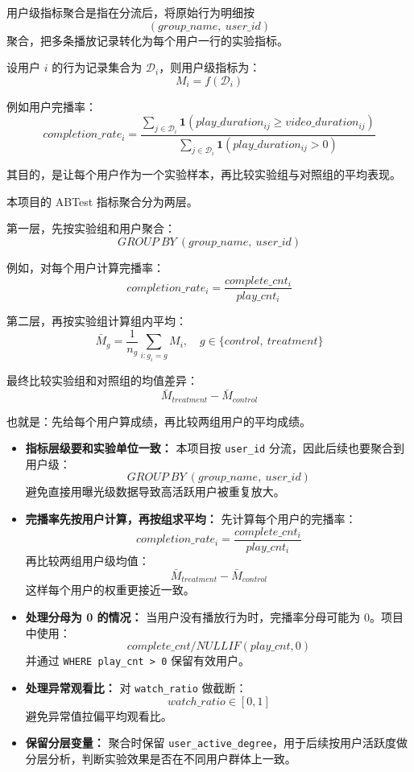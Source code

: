 \begin{definition}[用户级指标聚合]
用户级指标聚合是指在分流后，将原始行为明细按
\[
(group\_name,\ user\_id)
\]
聚合，把多条播放记录转化为每个用户一行的实验指标。

设用户 $i$ 的行为记录集合为 $\mathcal{D}_i$，则用户级指标为：
\[
M_i = f(\mathcal{D}_i)
\]

例如用户完播率：
\[
completion\_rate_i
=
\frac{
\sum_{j \in \mathcal{D}_i}
\mathbf{1}(play\_duration_{ij} \geq video\_duration_{ij})
}{
\sum_{j \in \mathcal{D}_i}
\mathbf{1}(play\_duration_{ij} > 0)
}
\]

其目的，是让每个用户作为一个实验样本，再比较实验组与对照组的平均表现。
\end{definition}
\begin{example}[两层指标聚合]
本项目的 ABTest 指标聚合分为两层。

第一层，先按实验组和用户聚合：
\[
GROUP\ BY\ (group\_name,\ user\_id)
\]

例如，对每个用户计算完播率：
\[
completion\_rate_i
=
\frac{complete\_cnt_i}{play\_cnt_i}
\]

第二层，再按实验组计算组内平均：
\[
\bar{M}_{g}
=
\frac{1}{n_g}
\sum_{i:g_i=g} M_i,
\quad
g \in \{control,\ treatment\}
\]

最终比较实验组和对照组的均值差异：
\[
\bar{M}_{treatment} - \bar{M}_{control}
\]

也就是：先给每个用户算成绩，再比较两组用户的平均成绩。
\end{example}
\begin{itemize}
    \item \textbf{指标层级要和实验单位一致：}
    本项目按 \texttt{user\_id} 分流，因此后续也要聚合到用户级：
    \[
    GROUP\ BY\ (group\_name,\ user\_id)
    \]
    避免直接用曝光级数据导致高活跃用户被重复放大。

    \item \textbf{完播率先按用户计算，再按组求平均：}
    先计算每个用户的完播率：
    \[
    completion\_rate_i
    =
    \frac{complete\_cnt_i}{play\_cnt_i}
    \]
    再比较两组用户级均值：
    \[
    \bar{M}_{treatment} - \bar{M}_{control}
    \]
    这样每个用户的权重更接近一致。

    \item \textbf{处理分母为 0 的情况：}
    当用户没有播放行为时，完播率分母可能为 $0$。项目中使用：
    \[
    complete\_cnt / NULLIF(play\_cnt, 0)
    \]
    并通过 \texttt{WHERE play\_cnt > 0} 保留有效用户。

    \item \textbf{处理异常观看比：}
    对 \texttt{watch\_ratio} 做截断：
    \[
    watch\_ratio \in [0,1]
    \]
    避免异常值拉偏平均观看比。

    \item \textbf{保留分层变量：}
    聚合时保留 \texttt{user\_active\_degree}，用于后续按用户活跃度做分层分析，判断实验效果是否在不同用户群体上一致。
\end{itemize}
